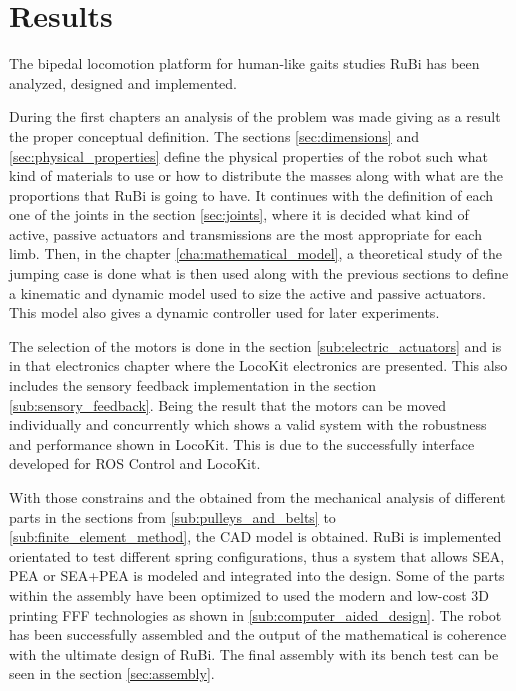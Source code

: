 \chapter{Results} %
\label{cha:results}

The bipedal locomotion platform for human-like gaits studies RuBi has been analyzed, designed and implemented.


During the first chapters an analysis of the problem was made giving as a result the proper conceptual definition.
The sections \ref{sec:dimensions} and \ref{sec:physical_properties} define the physical properties of the robot such what kind of materials to use or how to distribute the masses along with what are the proportions that RuBi is going to have.
It continues with the definition of each one of the joints in the section \ref{sec:joints}, where it is decided what kind of active, passive actuators and transmissions are the most appropriate for each limb.
Then, in the chapter \ref{cha:mathematical_model}, a theoretical study of the jumping case is done what is then used along with the previous sections to define a kinematic and dynamic model used to size the active and passive actuators.
This model also gives a dynamic controller used for later experiments.

The selection of the motors is done in the section \ref{sub:electric_actuators} and is in that electronics chapter where the LocoKit electronics are presented. 
This also includes the sensory feedback implementation in the section \ref{sub:sensory_feedback}. 
Being the result that the motors can be moved individually and concurrently which shows a valid system with the robustness and performance shown in LocoKit.
This is due to the successfully interface developed for ROS Control and LocoKit.

With those constrains and the obtained from the mechanical analysis of different parts in the sections from \ref{sub:pulleys_and_belts} to \ref{sub:finite_element_method}, the CAD model is obtained.
RuBi is implemented orientated to test different spring configurations, thus a system that allows SEA, PEA or SEA+PEA is modeled and integrated into the design.
Some of the parts within the assembly have been optimized to used the modern and low-cost 3D printing FFF technologies as shown in \ref{sub:computer_aided_design}.
The robot has been successfully assembled and the output of the mathematical is coherence with the ultimate design of RuBi.
The final assembly with its bench test can be seen in the section \ref{sec:assembly}.

